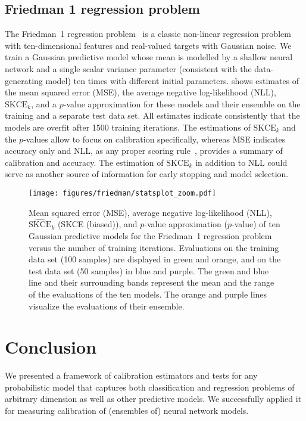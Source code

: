 \documentclass{article}
\begin{document}
\subsection{Friedman 1 regression problem}

The Friedman~1 regression problem~\citep{Friedman1979,Friedman1983,Friedman1991}
is a classic non-linear regression problem with ten-dimensional features and
real-valued targets with Gaussian noise. We train a Gaussian predictive model
whose mean is modelled by a shallow neural network and
a single scalar
variance
parameter (consistent with the data-generating model) ten times
with different initial parameters.  shows estimates of the
mean squared error (MSE),
the average negative log-likelihood (NLL), $\mathrm{SKCE}_k$, and a $p$-value
approximation for these models and their ensemble on the training and a separate
test data set.
All estimates indicate consistently
that the models are overfit after 1500 training iterations. The estimations of
$\mathrm{SKCE}_k$ and the $p$-values allow to focus on calibration specifically,
whereas MSE indicates accuracy only and NLL, as any proper scoring rule~\citep{Broecker2009}, provides a summary of calibration and accuracy. The estimation
of $\mathrm{SKCE}_k$ in addition to NLL could serve as another source of information
for early stopping and model selection.

\begin{figure}[!hbtp]
    \centering
    \texttt{[image: figures/friedman/statsplot\_zoom.pdf]}
    \caption{Mean squared error (MSE), average negative log-likelihood (NLL),
    $\widehat{\mathrm{SKCE}}_k$ (SKCE (biased)), and $p$-value approximation ($p$-value) of
    ten Gaussian predictive models for the Friedman~1 regression problem versus
    the number of training iterations.
    Evaluations on the training data set (100 samples) are displayed in green
    and orange, and on the test data set (50 samples) in blue and purple.
    The green and blue line and their surrounding bands represent
    the mean and the range of the evaluations of the ten models. The orange and
    purple lines visualize the evaluations of their ensemble.}%
    \label{fig:friedman1_zoom}
\end{figure}

\section{Conclusion}

We presented a framework of calibration estimators and tests for any
probabilistic model that captures both classification and regression
problems of arbitrary dimension
as well as other predictive models.
We successfully applied it
for measuring calibration of (ensembles of) neural network models.
\end{document}
